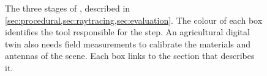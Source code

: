 \begin{figure}[t]
{%
}
\caption{The three stages of \housionna{}, described in \cref{sec:procedural,sec:raytracing,sec:evaluation}. The colour of each box identifies the tool responsible for the step. An agricultural digital twin also needs field measurements to calibrate the materials and antennas of the scene. Each box links to the section that describes it.}
\label{fig:pipeline}
\end{figure}
